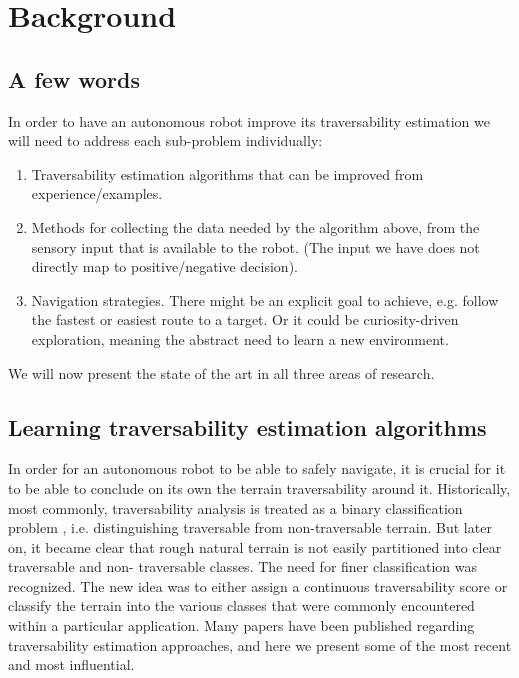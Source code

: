 \documentclass[12pt,a4paper,table,dvipsnames,tikz]{report}
\begin{document}
	\chapter{Background}
	\label{sec:bg}
	
	\section{A few words}
	\label{sec:bg:intro}
	
	In order to have an autonomous robot improve its traversability 
	estimation we will need to address each sub-problem individually:
	
	\begin{enumerate}
		\item Traversability estimation algorithms that can be improved from 
		experience/examples.
		\item Methods for collecting the data needed by the algorithm above, from 
		the sensory input that is available to the robot. (The input we have does not 
		directly map to positive/negative decision).
		\item Navigation strategies. There might be an explicit goal to achieve, e.g.
		follow the fastest or easiest route to a target. Or it could be curiosity-driven 
		exploration, meaning the abstract need to learn a new environment.
	\end{enumerate}
	
	We will now present the state of the art in all three areas of research.
	\\
	
	\section{Learning traversability estimation algorithms}
	\label{sec:bg:trav}
	
	In order for an autonomous robot to be able to safely navigate, it is crucial 
	for it to be able to conclude on its own the terrain traversability 
	around it. Historically, most commonly, traversability analysis is 
	treated as a binary classification problem \citep{Papadakis}, i.e. distinguishing 
	traversable from non-traversable terrain. But later on, it became clear that 
	rough natural terrain is not easily partitioned into clear traversable and non-
	traversable classes. The need for finer classification was recognized. The new 
	idea was to either assign a continuous traversability score or classify 
	the terrain into the various classes that were commonly encountered within a 
	particular application. Many papers have been published regarding 
	traversability estimation approaches, and here we present some of the 
	most recent and most influential.
	\\
	
\end{document}
